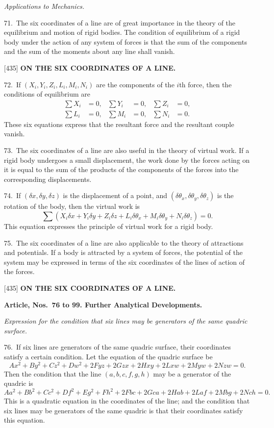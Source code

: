 \documentclass[12pt,a4paper]{article}
\newcommand{\paperref}[1]{\textup{[#1]}}
\theoremstyle{definition}
\begin{document}
\textit{Applications to Mechanics.}

71.~The six coordinates of a line are of great importance in the theory of the equilibrium and motion of rigid bodies. The condition of equilibrium of a rigid body under the action of any system of forces is that the sum of the components and the sum of the moments about any line shall vanish.

\newpage
\setcounter{page}{92}

\noindent\paperref{435}\quad
\textbf{ON THE SIX COORDINATES OF A LINE.}

72.~If $(X_i, Y_i, Z_i, L_i, M_i, N_i)$ are the components of the $i$th force, then the conditions of equilibrium are
\begin{align*}
\sum X_i &= 0, & \sum Y_i &= 0, & \sum Z_i &= 0,\\
\sum L_i &= 0, & \sum M_i &= 0, & \sum N_i &= 0.
\end{align*}
These six equations express that the resultant force and the resultant couple vanish.

73.~The six coordinates of a line are also useful in the theory of virtual work. If a rigid body undergoes a small displacement, the work done by the forces acting on it is equal to the sum of the products of the components of the forces into the corresponding displacements.

74.~If $(\delta x, \delta y, \delta z)$ is the displacement of a point, and $(\delta\theta_x, \delta\theta_y, \delta\theta_z)$ is the rotation of the body, then the virtual work is
\[
\sum (X_i \delta x + Y_i \delta y + Z_i \delta z + L_i \delta\theta_x + M_i \delta\theta_y + N_i \delta\theta_z) = 0.
\]
This equation expresses the principle of virtual work for a rigid body.

75.~The six coordinates of a line are also applicable to the theory of attractions and potentials. If a body is attracted by a system of forces, the potential of the system may be expressed in terms of the six coordinates of the lines of action of the forces.

\newpage
\setcounter{page}{93}

\noindent\paperref{435}\quad
\textbf{ON THE SIX COORDINATES OF A LINE.}

\smallskip
\textbf{Article, Nos.~76 to 99. Further Analytical Developments.}

\smallskip
\textit{Expression for the condition that six lines may be generators of the same quadric surface.}

76.~If six lines are generators of the same quadric surface, their coordinates satisfy a certain condition. Let the equation of the quadric surface be
\[
Ax^2 + By^2 + Cz^2 + Dw^2 + 2Fyz + 2Gzx + 2Hxy + 2Lxw + 2Myw + 2Nzw = 0.
\]
Then the condition that the line $(a, b, c, f, g, h)$ may be a generator of the quadric is
\[
A a^2 + B b^2 + C c^2 + D f^2 + E g^2 + F h^2 + 2F bc + 2G ca + 2H ab + 2L af + 2M bg + 2N ch = 0.
\]
This is a quadratic equation in the coordinates of the line; and the condition that six lines may be generators of the same quadric is that their coordinates satisfy this equation.
\end{document}
